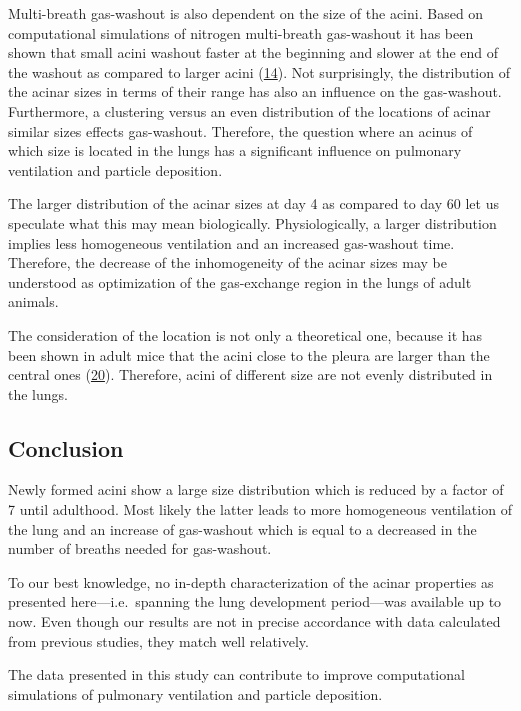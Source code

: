 \documentclass[
  american,
]{article}
\begin{document}
Multi-breath gas-washout is also dependent on the size of the acini.
Based on computational simulations of nitrogen multi-breath gas-washout it has been shown that small acini washout faster at the beginning and slower at the end of the washout as compared to larger acini (\protect\hyperlink{ref-eb0gk6VO}{14}).
Not surprisingly, the distribution of the acinar sizes in terms of their range has also an influence on the gas-washout.
Furthermore, a clustering versus an even distribution of the locations of acinar similar sizes effects gas-washout.
Therefore, the question where an acinus of which size is located in the lungs has a significant influence on pulmonary ventilation and particle deposition.

The larger distribution of the acinar sizes at day 4 as compared to day 60 let us speculate what this may mean biologically.
Physiologically, a larger distribution implies less homogeneous ventilation and an increased gas-washout time.
Therefore, the decrease of the inhomogeneity of the acinar sizes may be understood as optimization of the gas-exchange region in the lungs of adult animals.

The consideration of the location is not only a theoretical one, because it has been shown in adult mice that the acini close to the pleura are larger than the central ones (\protect\hyperlink{ref-RGBeCf8v}{20}).
Therefore, acini of different size are not evenly distributed in the lungs.

\hypertarget{conclusion}{%
\subsection{Conclusion}\label{conclusion}}

Newly formed acini show a large size distribution which is reduced by a factor of 7 until adulthood.
Most likely the latter leads to more homogeneous ventilation of the lung and an increase of gas-washout which is equal to a decreased in the number of breaths needed for gas-washout.

To our best knowledge, no in-depth characterization of the acinar properties as presented here---i.e.~spanning the lung development period---was available up to now.
Even though our results are not in precise accordance with data calculated from previous studies, they match well relatively.

The data presented in this study can contribute to improve computational simulations of pulmonary ventilation and particle deposition.
\end{document}
